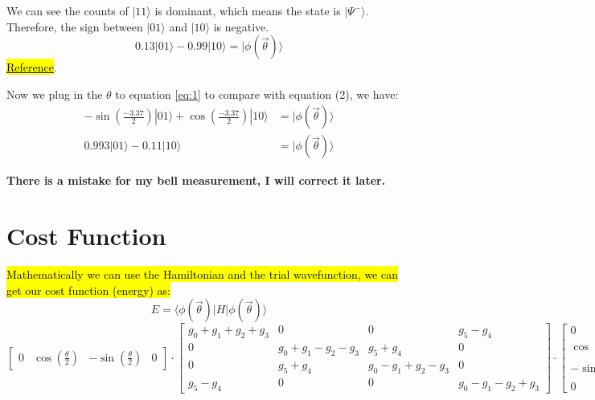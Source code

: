 \documentclass{article}
\begin{document}
We can see the counts of \(|11\rangle\) is dominant, which means the state is \(|\Psi^-\rangle\). Therefore, the sign between \(|01\rangle\) and \(|10\rangle\) is negative.
\begin{equation}
	0.13|01\rangle - 0.99 |10\rangle = |\phi(\vec{\theta}) \rangle
\end{equation}
\href{https://grishmaprs.medium.com/measurement-based-quantum-computation-9de426f40856}{\hl{Reference}}.


Now we plug in the \(\theta\) to equation \eqref{eq:1} to compare with equation (2), we have:
\begin{align*}
	-\sin\left(\frac{-3.37}{2}\right) |01 \rangle + \cos\left(\frac{-3.37}{2}\right) |10 \rangle & = |\phi(\vec{\theta}) \rangle \\
	0.993 |01\rangle  - 0.11 |10\rangle                                                          & = |\phi(\vec{\theta}) \rangle
\end{align*}

\begin{center}
	\textbf{There is a mistake for my bell measurement, I will correct it later.}
\end{center}

\section{Cost Function}
\hl{Mathematically we can use the Hamiltonian and the trial wavefunction, we can get our cost function (energy) as:}
\[E = \langle \phi({\vec{\theta}})| H | \phi(\vec{\theta}) \rangle\]
\[
	\begin{bmatrix}
		0 & \cos(\frac{\theta}{2}) & -\sin(\frac{\theta}{2}) & 0
	\end{bmatrix}
	\cdot
	\begin{bmatrix}
		g_0 + g_1 + g_2 + g_3 & 0                     & 0                     & g_5 - g_4              \\
		0                     & g_0 + g_1 - g_2 - g_3 & g_5 + g_4             & 0                      \\
		0                     & g_5 + g_4             & g_0 - g_1 + g_2 - g_3 & 0                      \\
		g_5 - g_4             & 0                     & 0                     & g_0 - g_1 - g_2 +  g_3
	\end{bmatrix}
	\cdot
	\begin{bmatrix}
		0                        \\
		\cos(\frac{\theta}{2})   \\
		- \sin(\frac{\theta}{2}) \\
		0
	\end{bmatrix}
\]
\end{document}
